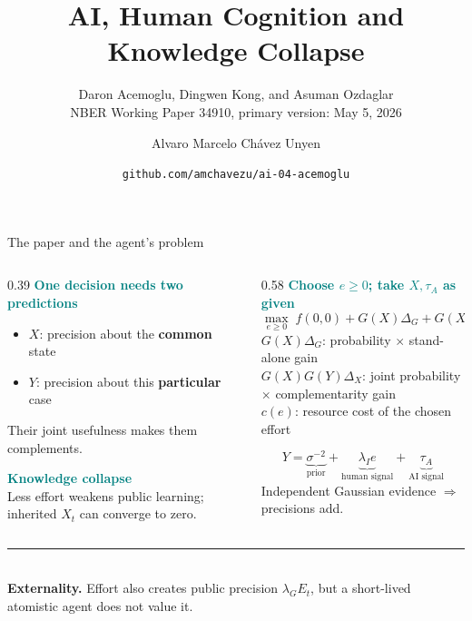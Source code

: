 \documentclass[aspectratio=169,11pt]{beamer}
\title{AI, Human Cognition and\\Knowledge Collapse}
\subtitle{Daron Acemoglu, Dingwen Kong, and Asuman Ozdaglar\\
NBER Working Paper 34910, primary version: May 5, 2026}
\author{Alvaro Marcelo Chávez Unyen}
\date{\texttt{github.com/amchavezu/ai-04-acemoglu}}
\newcommand{\key}[1]{\textcolor{Teal}{\textbf{#1}}}
\begin{document}
{
\begin{frame}[plain]
  \vspace{0.65cm}
  {\color{Paper}\inserttitle\par}
  \vspace{0.45cm}
  {\color{Paper}\insertsubtitle\par}
  \vfill
  {\large\color{Paper}\insertauthor\par}
  \vspace{0.12cm}
  {\small\color{Paper}\insertdate\par}
  \vspace{0.45cm}
\end{frame}
}

\begin{frame}{The paper and the agent's problem}
\small
\begin{columns}[T,totalwidth=\textwidth]
\begin{column}{0.39\textwidth}
  \key{One decision needs two predictions}
  \begin{itemize}\setlength\itemsep{0.06cm}
    \item \(X\): precision about the \textbf{common} state
    \item \(Y\): precision about this \textbf{particular} case
  \end{itemize}
  Their joint usefulness makes them complements.

  \vspace{0.10cm}
  \key{Knowledge collapse}\\[-0.02cm]
  Less effort weakens public learning; inherited \(X_t\) can converge to zero.
\end{column}
\begin{column}{0.58\textwidth}
  \key{Choose \(e\geq0\); take \(X,\tau_A\) as given}
  \[
  \max_{e\geq0}\;
  f(0,0)+G(X)\Delta_G+G(X)G(Y)\Delta_X-c(e)
  \]
  {\scriptsize
  \(G(X)\Delta_G\): probability \(\times\) stand-alone gain\\
  \(G(X)G(Y)\Delta_X\): joint probability \(\times\) complementarity gain\\
  \(c(e)\): resource cost of the chosen effort
  }

  \vspace{0.04cm}
  \[
  Y=\underbrace{\sigma^{-2}}_{\text{prior}}
  +\underbrace{\lambda_Ie}_{\text{human signal}}
  +\underbrace{\tau_A}_{\text{AI signal}}
  \]
  {\small Independent Gaussian evidence \(\Rightarrow\) precisions add.}
\end{column}
\end{columns}

\vfill
{\color{Coral}\rule{\textwidth}{0.8pt}}\\[-0.04cm]
{\small\textbf{Externality.} Effort also creates public precision
\(\lambda_GE_t\), but a short-lived atomistic agent does not value it.}
\end{frame}
\end{document}
